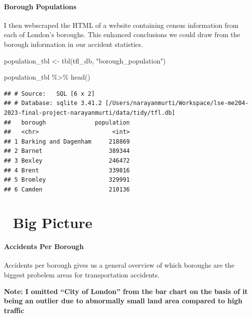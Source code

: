 \documentclass[
]{article}
\newenvironment{Shaded}{\begin{snugshade}}{\end{snugshade}}
\newcommand{\FunctionTok}[1]{\textcolor[rgb]{0.00,0.00,0.00}{#1}}
\newcommand{\NormalTok}[1]{#1}
\newcommand{\OtherTok}[1]{\textcolor[rgb]{0.56,0.35,0.01}{#1}}
\newcommand{\SpecialCharTok}[1]{\textcolor[rgb]{0.00,0.00,0.00}{#1}}
\newcommand{\StringTok}[1]{\textcolor[rgb]{0.31,0.60,0.02}{#1}}
\begin{document}
\hypertarget{borough-populations}{%
\paragraph{Borough Populations}\label{borough-populations}}

I then webscraped the HTML of a website containing census information
from each of London's boroughs. This enhanced conclusions we could draw
from the borough information in our accident statistics.

\begin{Shaded}
\begin{Highlighting}[]
\NormalTok{population\_tbl }\OtherTok{\textless{}{-}} \FunctionTok{tbl}\NormalTok{(tfl\_db, }\StringTok{"borough\_population"}\NormalTok{)}

\NormalTok{population\_tbl }\SpecialCharTok{\%\textgreater{}\%}
  \FunctionTok{head}\NormalTok{()}
\end{Highlighting}
\end{Shaded}

\begin{verbatim}
## # Source:   SQL [6 x 2]
## # Database: sqlite 3.41.2 [/Users/narayanmurti/Workspace/lse-me204-2023-final-project-narayanmurti/data/tidy/tfl.db]
##   borough              population
##   <chr>                     <int>
## 1 Barking and Dagenham     218869
## 2 Barnet                   389344
## 3 Bexley                   246472
## 4 Brent                    339816
## 5 Bromley                  329991
## 6 Camden                   210136
\end{verbatim}

\hypertarget{big-picture}{%
\section{🚁 Big Picture}\label{big-picture}}

\hypertarget{accidents-per-borough}{%
\paragraph{Accidents Per Borough}\label{accidents-per-borough}}

Accidents per borough gives us a general overview of which boroughs are
the biggest probelem areas for transportation accidents.

\textbf{Note: I omitted ``City of London'' from the bar chart on the
basis of it being an outlier due to abnormally small land area compared
to high traffic}
\end{document}
